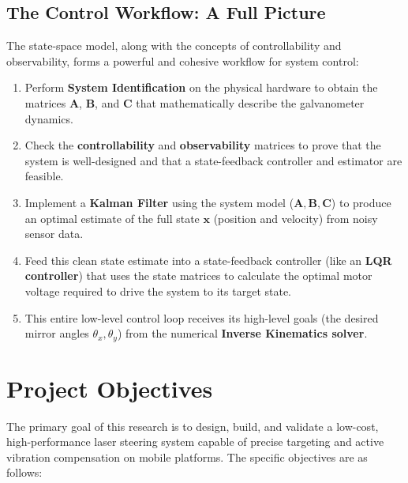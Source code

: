 \documentclass[12pt]{article}
\begin{document}
\subsection{The Control Workflow: A Full Picture}
The state-space model, along with the concepts of controllability and observability, forms a powerful and cohesive workflow for system control:
\begin{enumerate}
    \item Perform \textbf{System Identification} on the physical hardware to obtain the matrices \(\mathbf{A}\), \(\mathbf{B}\), and \(\mathbf{C}\) that mathematically describe the galvanometer dynamics.
    \item Check the \textbf{controllability} and \textbf{observability} matrices to prove that the system is well-designed and that a state-feedback controller and estimator are feasible.
    \item Implement a \textbf{Kalman Filter} using the system model (\(\mathbf{A, B, C}\)) to produce an optimal estimate of the full state \(\mathbf{x}\) (position and velocity) from noisy sensor data.
    \item Feed this clean state estimate into a state-feedback controller (like an \textbf{LQR controller}) that uses the state matrices to calculate the optimal motor voltage required to drive the system to its target state.
    \item This entire low-level control loop receives its high-level goals (the desired mirror angles \(\theta_x, \theta_y\)) from the numerical \textbf{Inverse Kinematics solver}.
\end{enumerate}

\newpage

\section{Project Objectives}

The primary goal of this research is to design, build, and validate a low-cost, high-performance laser steering system capable of precise targeting and active vibration compensation on mobile platforms. The specific objectives are as follows:
\end{document}
